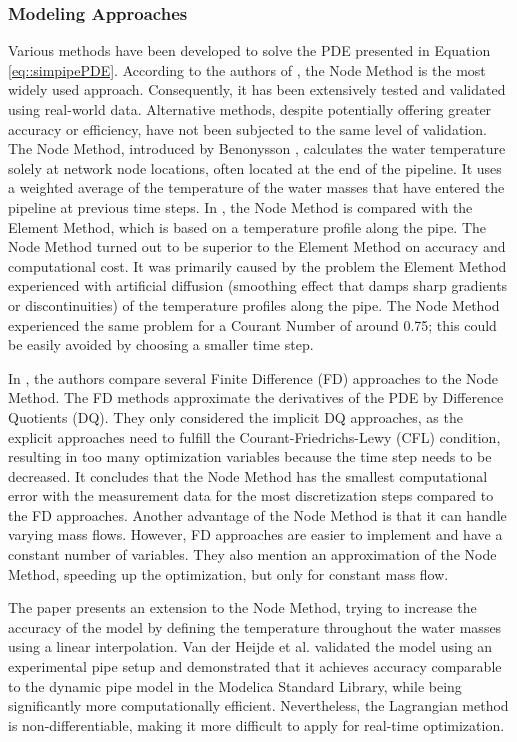 \subsubsection{Modeling Approaches}\label{sec::thermodynamicmethods}
Various methods have been developed to solve the PDE presented in Equation \ref{eq::simpipePDE}. According to the authors of \cite{KUNTUAROVA}, the Node Method is the most widely used approach. Consequently, it has been extensively tested and validated using real-world data. Alternative methods, despite potentially offering greater accuracy or efficiency, have not been subjected to the same level of validation. The Node Method, introduced by Benonysson \cite{BENONYSSON1995297}, calculates the water temperature solely at network node locations, often located at the end of the pipeline. It uses a weighted average of the temperature of the water masses that have entered the pipeline at previous time steps. In \cite{NMvsEM}, the Node Method is compared with the Element Method, which is based on a temperature profile along the pipe. The Node Method turned out to be superior to the Element Method on accuracy and computational cost. It was primarily caused by the problem the Element Method experienced with artificial diffusion (smoothing effect that damps sharp gradients or discontinuities) of the temperature profiles along the pipe. The Node Method experienced the same problem for a Courant Number of around 0.75; this could be easily avoided by choosing a smaller time step. 

In \cite{MAURER2021244}, the authors compare several Finite Difference (FD) approaches to the Node Method. The FD methods approximate the derivatives of the PDE by Difference Quotients (DQ). They only considered the implicit DQ approaches, as the explicit approaches need to fulfill the Courant-Friedrichs-Lewy (CFL) condition, resulting in too many optimization variables because the time step needs to be decreased. It concludes that the Node Method has the smallest computational error with the measurement data for the most discretization steps compared to the FD approaches. Another advantage of the Node Method is that it can handle varying mass flows. However, FD approaches are easier to implement and have a constant number of variables. They also mention an approximation of the Node Method, speeding up the optimization, but only for constant mass flow.

The paper \cite{OPPELT2016336} presents an extension to the Node Method, trying to increase the accuracy of the model by defining the temperature throughout the water masses using a linear interpolation. Van der Heijde et al. \cite{VANDERHEIJDE2017158} validated the model using an experimental pipe setup and demonstrated that it achieves accuracy comparable to the dynamic pipe model in the Modelica Standard Library, while being significantly more computationally efficient. Nevertheless, the Lagrangian method is non-differentiable, making it more difficult to apply for real-time optimization. 

